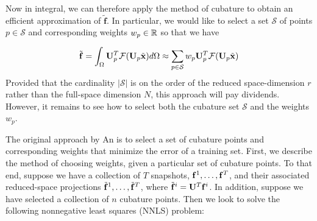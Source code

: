 {Now in integral, we can therefore apply the method of cubature \cite{Press:1992:NumRecipes} to obtain an efficient approximation of $\tilde{\mathbf{f}}$. In particular, we would like to select a set
$\mathcal{S}$ of points $p \in \mathcal{S}$ and corresponding weights $w_p \in \mathbb{R}$ so that we have

\begin{equation}
\label{eq:integral}
\tilde{\mathbf{f}} = \int_{\Omega} \mathbf{U}_p^T \mathcal{F}(\mathbf{U}_p \tilde{\mathbf{x}})d\Omega \approx \sum_{p \in \mathcal{S}} w_p \mathbf{U}_p^T \mathcal{F}(\mathbf{U}_p \tilde{\mathbf{x}})
\end{equation}
Provided that the cardinality $|\mathcal{S}|$ is on the order of the reduced space-dimension $r$ rather than the full-space dimension $N$, this approach will pay dividends. However, it remains to see
how to select both the cubature set $\mathcal{S}$ and the weights $w_p$. 

The original approach by An is to select a set of cubature points and corresponding weights that minimize the error of a training set. First, we describe the method of choosing weights,
given a particular set of cubature points. To that end, suppose we have a collection of $T$ snapshots, $\mathbf{f}^1, \dots, \mathbf{f}^T$, and
their associated reduced-space projections $\tilde{\mathbf{f}}^1, \dots, \tilde{\mathbf{f}}^T$, where $\tilde{\mathbf{f}}^i = \mathbf{U}^T\mathbf{f}^i$. In addition, suppose we have selected a collection of $n$ cubature points. Then we look to solve the
following nonnegative least squares (NNLS) problem:

}
